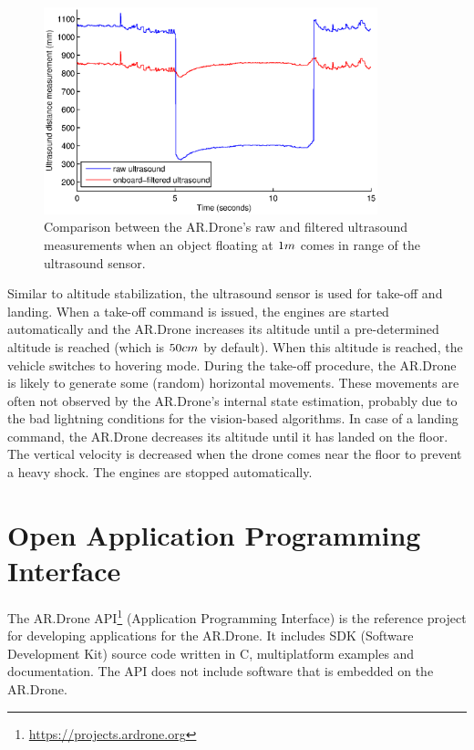 \begin{figure}[htb]
\centering
\includegraphics[height=6cm]{images/altitude_raw_vs_filtered_1m_obstacle.eps}
\caption{Comparison between the AR.Drone's raw and filtered ultrasound measurements when an object floating at  $1\small{m}$ comes in range of the ultrasound sensor.}
\label{fig:platform-ultasound-raw-filtered}
\end{figure}

Similar to altitude stabilization, the ultrasound sensor is used for take-off and landing.
When a take-off command is issued, the engines are started automatically and the AR.Drone increases its altitude until a pre-determined altitude is reached (which is $50\small{cm}$ by default). When this altitude is reached, the vehicle switches to hovering mode.
During the take-off procedure, the AR.Drone is likely to generate some (random) horizontal movements.
These movements are often not observed by the AR.Drone's internal state estimation, probably due to the bad lightning conditions for the vision-based algorithms.
In case of a landing command, the AR.Drone decreases its altitude until it has landed on the floor. The vertical velocity is decreased when the drone comes near the floor to prevent a heavy shock.
The engines are stopped automatically.



\section{Open Application Programming Interface}
\label{sec:API}
The AR.Drone API\footnote{\url{https://projects.ardrone.org}} (Application Programming Interface) is the reference project for developing applications for the AR.Drone.
It includes SDK (Software Development Kit) source code written in C, multiplatform examples and documentation.
The API does not include software that is embedded on the AR.Drone.

